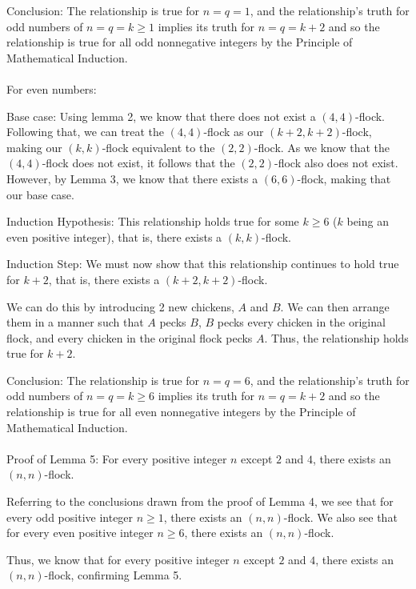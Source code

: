 \documentclass[answers]{exam}
\begin{document}
\begin{questions}
\begin{solution}
            Conclusion: The relationship is true for $n = q = 1$, and the relationship’s truth for odd numbers of $n = q = k \geq 1$ implies its truth for $n = q = k + 2$ and so the relationship is true for all odd nonnegative integers by the Principle of Mathematical Induction.
            \\\\

            For even numbers:
            
            Base case: Using lemma 2, we know that there does not exist a $(4, 4)$-flock. Following that, we can treat the $(4, 4)$-flock as our $(k+2, k+2)$-flock, making our $(k, k)$-flock equivalent to the $(2, 2)$-flock. As we know that the $(4, 4)$-flock does not exist, it follows that the $(2, 2)$-flock also does not exist. However, by Lemma 3, we know that there exists a $(6, 6)$-flock, making that our base case.

            Induction Hypothesis: This relationship holds true for some $k \geq 6$ ($k$ being an even positive integer), that is, there exists a $(k, k)$-flock.

            Induction Step: We must now show that this relationship continues to hold true for $k + 2$, that is, there exists a $(k+2, k+2)$-flock. 
            
            We can do this by introducing 2 new chickens, $A$ and $B$. We can then arrange them in a manner such that $A$ pecks $B$, $B$ pecks every chicken in the original flock, and every chicken in the original flock pecks $A$. Thus, the relationship holds true for $k+2$.

            Conclusion: The relationship is true for $n = q = 6$, and the relationship’s truth for odd numbers of $n = q = k \geq 6$ implies its truth for $n = q = k + 2$ and so the relationship is true for all even nonnegative integers by the Principle of Mathematical Induction.
            \\\\

            Proof of Lemma 5: For every positive integer $n$ except $2$ and $4$, there exists an $(n,n)$-flock.

            Referring to the conclusions drawn from the proof of Lemma 4, we see that for every odd positive integer $n \geq 1$, there exists an $(n, n)$-flock. We also see that for every even positive integer $n \geq 6$, there exists an $(n, n)$-flock. 

            Thus, we know that for every positive integer $n$ except $2$ and $4$, there exists an $(n,n)$-flock, confirming Lemma 5.
            \\\\


\end{solution}
\end{questions}
\end{document}
